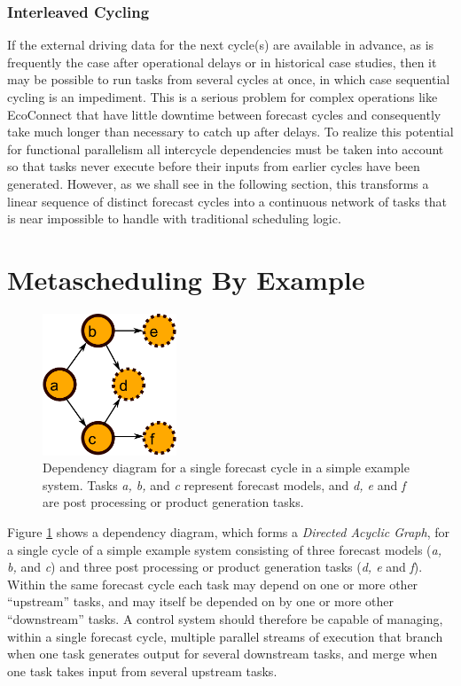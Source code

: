 \documentclass[11pt,a4paper]{article}
\begin{document}
\subsubsection{Interleaved Cycling}

If the external driving data for the next cycle(s) are available in
advance, as is frequently the case after operational delays or in
historical case studies, then it may be possible to run tasks from
several cycles at once, in which case sequential cycling is an
impediment. This is a serious problem for complex operations like
EcoConnect that have little downtime between forecast cycles and
consequently take much longer than necessary to catch up after delays.
To realize this potential for functional parallelism all intercycle
dependencies must be taken into account so that tasks never execute
before their inputs from earlier cycles have been generated. However, as
we shall see in the following section, this transforms a linear sequence
of distinct forecast cycles into a continuous network of tasks that is
near impossible to handle with traditional scheduling logic.  

\section{Metascheduling By Example}

\begin{figure} 
    \begin{center}
    \includegraphics[width=4cm]{dependencies-one} 
    \end{center}
    \caption{\small Dependency diagram for a single forecast cycle in a
    simple example system. Tasks {\em a, b,} and {\em c} represent
    forecast models, and {\em d, e} and {\em f} are post processing or
    product generation tasks.} 
    \label{fig-dep-one} 
\end{figure} 

Figure \ref{fig-dep-one} shows a dependency diagram, which forms a
{\em Directed Acyclic Graph}, for a single cycle of a simple example
system consisting of three forecast models ({\em a, b,} and {\em c}) and
three post processing or product generation tasks ({\em d, e} and {\em
f}).  Within the same forecast cycle each task may depend on one or
more other ``upstream'' tasks, and may itself be depended on by one or
more other ``downstream'' tasks.  A control system should therefore be
capable of managing, within a single forecast cycle, multiple parallel
streams of execution that branch when one task generates output for
several downstream tasks, and merge when one task takes input from
several upstream tasks. 
\end{document}
